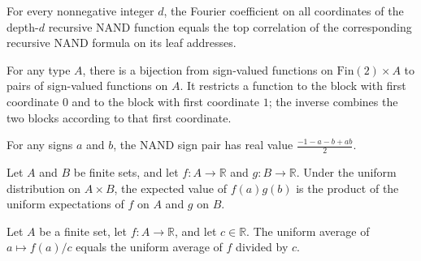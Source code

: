\begin{theorem}
\label{FABL.fourierCoeff_recursiveNAND_univ_eq_addressTopCoeff}
\leanok
{}
For every nonnegative integer $d$, the Fourier coefficient on all coordinates of the
depth-$d$ recursive NAND function equals the top correlation of the corresponding
recursive NAND formula on its leaf addresses.
\end{theorem}

\begin{definition}
\label{FABL.splitTwoBlocksEquiv}
\leanok
{}
For any type $A$, there is a bijection from sign-valued functions on
$\mathrm{Fin}(2)\times A$ to pairs of sign-valued functions on $A$. It restricts a
function to the block with first coordinate $0$ and to the block with first coordinate
$1$; the inverse combines the two blocks according to that first coordinate.
\end{definition}

\begin{theorem}
\label{FABL.signValue_nandPair}
\leanok
{}
For any signs $a$ and $b$, the NAND sign pair has real value $\frac{-1-a-b+ab}{2}$.
\end{theorem}

\begin{theorem}
\label{FABL.expect_pair_mul_separate}
\leanok
{}
Let $A$ and $B$ be finite sets, and let $f\colon A\to\mathbb R$ and $g\colon B\to\mathbb
R$. Under the uniform distribution on $A\times B$, the expected value of $f(a)g(b)$ is
the product of the uniform expectations of $f$ on $A$ and $g$ on $B$.
\end{theorem}

\begin{theorem}
\label{FABL.expect_div_const}
\leanok
{}
Let $A$ be a finite set, let $f:A\to\mathbb R$, and let $c\in\mathbb R$. The uniform
average of $a\mapsto f(a)/c$ equals the uniform average of $f$ divided by $c$.
\end{theorem}

